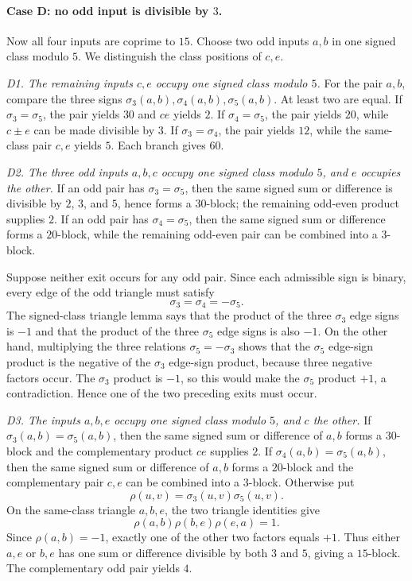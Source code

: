 \paragraph{Case D: no odd input is divisible by $3$.}
Now all four inputs are coprime to $15$.  Choose two odd inputs $a,b$ in one
signed class modulo $5$.  We distinguish the class positions of $c,e$.

\smallskip
\noindent\emph{D1. The remaining inputs $c,e$ occupy one signed class modulo
$5$.}
For the pair $a,b$, compare the three signs
$\sigma_3(a,b),\sigma_4(a,b),\sigma_5(a,b)$.  At least two are equal.
If $\sigma_3=\sigma_5$, the pair yields $30$ and $ce$ yields $2$.  If
$\sigma_4=\sigma_5$, the pair yields $20$, while $c\pm e$ can be made
divisible by $3$.  If $\sigma_3=\sigma_4$, the pair yields $12$, while the
same-class pair $c,e$ yields $5$.  Each branch gives $60$.

\smallskip
\noindent\emph{D2. The three odd inputs $a,b,c$ occupy one signed class
modulo $5$, and $e$ occupies the other.}
If an odd pair has $\sigma_3=\sigma_5$, then the same signed sum or
difference is divisible by $2$, $3$, and $5$, hence forms a $30$-block; the
remaining odd-even product supplies $2$.  If an odd pair has
$\sigma_4=\sigma_5$, then the same signed sum or difference forms a
$20$-block, while the remaining odd-even pair can be combined into a
$3$-block.

Suppose neither exit occurs for any odd pair.  Since each admissible sign is
binary, every edge of the odd triangle must satisfy
\[
 \sigma_3=\sigma_4=-\sigma_5.
\]
The signed-class triangle lemma says that the product of the three
$\sigma_3$ edge signs is $-1$ and that the product of the three $\sigma_5$
edge signs is also $-1$.  On the other hand, multiplying the three relations
$\sigma_5=-\sigma_3$ shows that the $\sigma_5$ edge-sign product is the
negative of the $\sigma_3$ edge-sign product, because three negative factors
occur.  The $\sigma_3$ product is $-1$, so this would make the $\sigma_5$
product $+1$, a contradiction.  Hence one of the two preceding exits must
occur.

\smallskip
\noindent\emph{D3. The inputs $a,b,e$ occupy one signed class modulo $5$,
and $c$ the other.}
If $\sigma_3(a,b)=\sigma_5(a,b)$, then the same signed sum or
difference of $a,b$ forms a $30$-block and the complementary product $ce$
supplies $2$.  If $\sigma_4(a,b)=\sigma_5(a,b)$, then the same signed sum
or difference of $a,b$ forms a $20$-block and the complementary pair $c,e$
can be combined into a $3$-block.  Otherwise put
\[
 \rho(u,v)=\sigma_3(u,v)\sigma_5(u,v).
\]
On the same-class triangle $a,b,e$, the two triangle identities give
\[
 \rho(a,b)\rho(b,e)\rho(e,a)=1.
\]
Since $\rho(a,b)=-1$, exactly one of the other two factors equals $+1$.
Thus either $a,e$ or $b,e$ has one sum or difference divisible by both $3$
and $5$, giving a $15$-block.  The complementary odd pair yields $4$.

